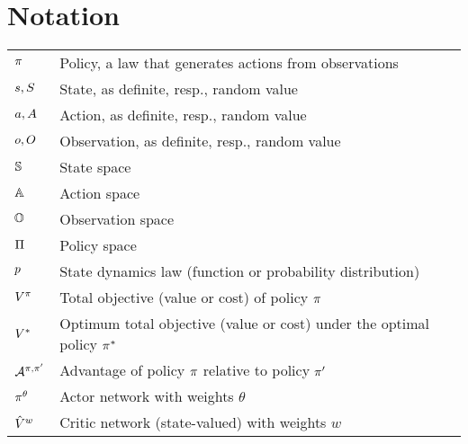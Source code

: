 \documentclass[12pt,twoside]{../../mitthesis}
\begin{document}
\section*{Notation}

\begin{tabularx}{0.97\textwidth}{ |p{}|p{}| }  
    \hline
    $\pi$ & Policy, a law that generates actions from observations \\ 
    $s, S$ & State, as definite, resp., random value \\ 
    $a, A$ & Action, as definite, resp., random value \\ 
    $o, O$ & Observation, as definite, resp., random value \\ 
    $\mathbb S$ & State space \\
    $\mathbb A$ & Action space \\
    $\mathbb O$ & Observation space \\
    $\Pi$ & Policy space \\
    $p$ & State dynamics law (function or probability distribution) \\ 
    $V^\pi$ & Total objective (value or cost) of policy $\pi$ \\
    $V^*$ & Optimum total objective (value or cost) under the optimal policy $\pi^*$ \\
    $\mathcal A^{\pi,\pi'}$ & Advantage of policy $\pi$ relative to policy $\pi'$ \\
    $\pi^\theta$ & Actor network with weights $\theta$ \\
    $\hat {V}^w$ & Critic network (state-valued) with weights $w$ \\
    \hline
\end{tabularx}
\end{document}
